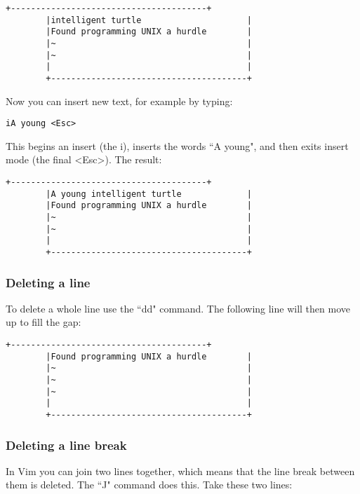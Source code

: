		\begin{Verbatim}[samepage=true]
		+---------------------------------------+
		|intelligent turtle                     |
		|Found programming UNIX a hurdle        |
		|~                                      |
		|~                                      |
		|                                       |
		+---------------------------------------+
		\end{Verbatim}

Now you can insert new text, for example by typing:

 \begin{Verbatim}[samepage=true]
 iA young <Esc>
 \end{Verbatim}

This begins an insert (the i), inserts the words ``A young", and then exits insert mode (the final <Esc>).
 The result: 
		\begin{Verbatim}[samepage=true]
		+---------------------------------------+
		|A young intelligent turtle             |
		|Found programming UNIX a hurdle        |
		|~                                      |
		|~                                      |
		|                                       |
		+---------------------------------------+
		\end{Verbatim}

\subsubsection{Deleting a line}

To delete a whole line use the ``dd" command.
The following line will then move up to fill the gap: 

		\begin{Verbatim}[samepage=true]
		+---------------------------------------+
		|Found programming UNIX a hurdle        |
		|~                                      |
		|~                                      |
		|~                                      |
		|                                       |
		+---------------------------------------+
		\end{Verbatim}

\subsubsection{Deleting a line break}

In Vim you can join two lines together, which means that the line break between them is deleted.
The ``J" command does this.
Take these two lines: 

